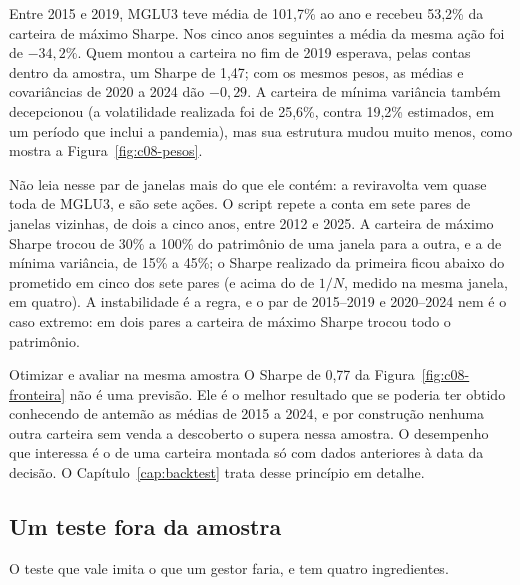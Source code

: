 
Entre 2015 e 2019, MGLU3 teve média de 101,7\% ao ano e recebeu 53,2\% da carteira de máximo Sharpe. Nos cinco anos seguintes a média da mesma ação foi de $-34,2\%$. Quem montou a carteira no fim de 2019 esperava, pelas contas dentro da amostra, um Sharpe de 1,47; com os mesmos pesos, as médias e covariâncias de 2020 a 2024 dão $-0,29$. A carteira de mínima variância também decepcionou (a volatilidade realizada foi de 25,6\%, contra 19,2\% estimados, em um período que inclui a pandemia), mas sua estrutura mudou muito menos, como mostra a Figura~\ref{fig:c08-pesos}.

Não leia nesse par de janelas mais do que ele contém: a reviravolta vem quase toda de MGLU3, e são sete ações. O script  repete a conta em sete pares de janelas vizinhas, de dois a cinco anos, entre 2012 e 2025. A carteira de máximo Sharpe trocou de 30\% a 100\% do patrimônio de uma janela para a outra, e a de mínima variância, de 15\% a 45\%; o Sharpe realizado da primeira ficou abaixo do prometido em cinco dos sete pares (e acima do de $1/N$, medido na mesma janela, em quatro). A instabilidade é a regra, e o par de 2015--2019 e 2020--2024 nem é o caso extremo: em dois pares a carteira de máximo Sharpe trocou todo o patrimônio.

\begin{armadilha}{Otimizar e avaliar na mesma amostra}
O Sharpe de 0,77 da Figura~\ref{fig:c08-fronteira} não é uma previsão. Ele é o melhor resultado que se poderia ter obtido conhecendo de antemão as médias de 2015 a 2024, e por construção nenhuma outra carteira sem venda a descoberto o supera nessa amostra. O desempenho que interessa é o de uma carteira montada só com dados anteriores à data da decisão. O Capítulo~\ref{cap:backtest} trata desse princípio em detalhe.
\end{armadilha}

\subsection{Um teste fora da amostra}

O teste que vale imita o que um gestor faria, e tem quatro ingredientes.

